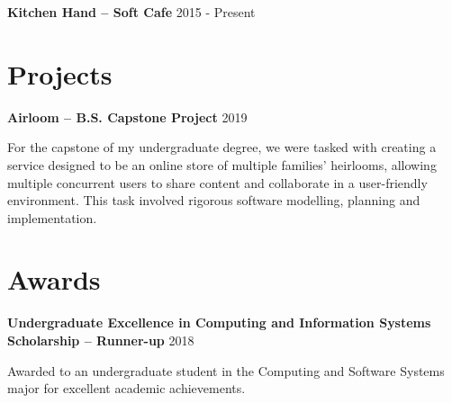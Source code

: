 \documentclass[10pt]{article}
\begin{document}
\begin{minipage}[t]{.60\textwidth}
\medskip

\textbf{Kitchen Hand -- Soft Cafe} \newline
{\footnotesize 2015 - Present}

\bigskip

\section{Projects}

\textbf{Airloom -- B.S. Capstone Project} \newline
{\footnotesize 2019}
\begin{flushleft}
For the capstone of my undergraduate degree, we were tasked with creating a service designed to be an online 
store of multiple families' heirlooms, allowing multiple concurrent users to share content and collaborate in a 
user-friendly environment. This task involved rigorous software modelling, planning and implementation. 
\end{flushleft}

\bigskip

\section{Awards}
\textbf{Undergraduate Excellence in Computing and Information Systems Scholarship -- Runner-up} \newline
{\footnotesize 2018} 
\begin{flushleft}
Awarded to an undergraduate student in the Computing and Software Systems major for excellent academic achievements.
\end{flushleft}

\end{minipage}
\end{document}
